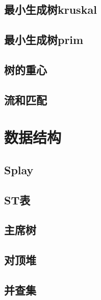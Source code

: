 \documentclass{article}
\begin{document}
\begin{multicols*}{3}
\subsection{最小生成树kruskal}


\subsection{最小生成树prim}


\subsection{树的重心}


\subsection{流和匹配}
\section{数据结构}
\subsection{Splay}


\subsection{ST表}


\subsection{主席树}


\subsection{对顶堆}


\subsection{并查集}



\end{multicols*}
\end{document}
